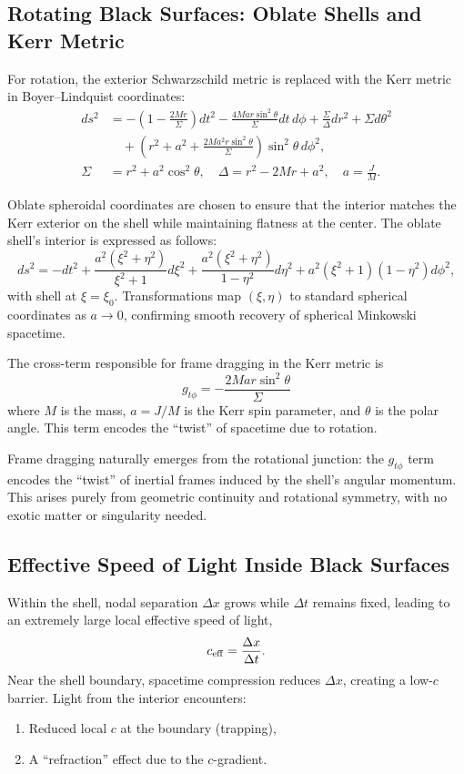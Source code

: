 \documentclass[12pt]{article}
\begin{document}
\subsection{Rotating Black Surfaces: Oblate Shells and Kerr Metric}

For rotation, the exterior Schwarzschild metric is replaced with the Kerr metric in Boyer--Lindquist coordinates:
\begin{align*}
ds^2 &= -\left(1 - \frac{2Mr}{\Sigma}\right) dt^2 - \frac{4Mar\sin^2\theta}{\Sigma} dt\, d\phi + \frac{\Sigma}{\Delta} dr^2 + \Sigma d\theta^2 \\
&\quad + \left(r^2 + a^2 + \frac{2Ma^2 r \sin^2\theta}{\Sigma} \right) \sin^2\theta\, d\phi^2,\\
\Sigma &= r^2 + a^2 \cos^2\theta, \quad \Delta = r^2 - 2Mr + a^2, \quad a = \frac{J}{M}.
\end{align*}

Oblate spheroidal coordinates are chosen to ensure that the interior matches the Kerr exterior on the shell while maintaining flatness at the center.  The oblate shell's interior is expressed as follows:
\[
ds^2 = -dt^2 + \frac{a^2(\xi^2 + \eta^2)}{\xi^2 + 1} d\xi^2 + \frac{a^2(\xi^2 + \eta^2)}{1 - \eta^2} d\eta^2 + a^2 (\xi^2 + 1)(1 - \eta^2) d\phi^2,
\]
with shell at \(\xi = \xi_0\). Transformations map \((\xi,\eta)\) to standard spherical coordinates as \(a \to 0\), confirming smooth recovery of spherical Minkowski spacetime.

The cross-term responsible for frame dragging in the Kerr metric is
\begin{equation}
g_{t\phi} = - \frac{2 M a r \sin^2\theta}{\Sigma}
\end{equation}
where $M$ is the mass, $a = J/M$ is the Kerr spin parameter, and $\theta$ is the polar angle. This term encodes the “twist” of spacetime due to rotation.

Frame dragging naturally emerges from the rotational junction: the \(g_{t\phi}\) term encodes the “twist” of inertial frames induced by the shell's angular momentum. This arises purely from geometric continuity and rotational symmetry, with no exotic matter or singularity needed.

\subsection{Effective Speed of Light Inside Black Surfaces}

Within the shell, nodal separation \(\Delta x\) grows while \(\Delta t\) remains fixed, leading to an extremely large local effective speed of light,
\[
c_{\rm eff} = \frac{\Delta x}{\Delta t}.
\]
Near the shell boundary, spacetime compression reduces \(\Delta x\), creating a low-\(c\) barrier. Light from the interior encounters:
\begin{enumerate}
    \item Reduced local \(c\) at the boundary (trapping),
    \item A “refraction” effect due to the \(c\)-gradient.
\end{enumerate}
\end{document}
